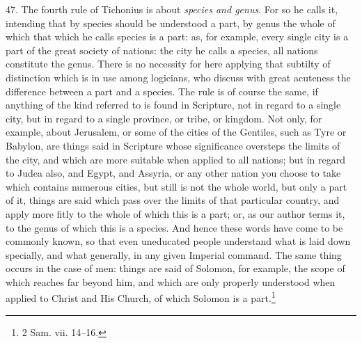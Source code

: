 47. The fourth rule of Tichonius is about \emph{species and genus}. For so he calls it, intending that by species should be understood a part, by genus the whole of which that which he calls species is a part: as, for example, every single city is a part of the great society of nations: the city he calls a species, all  nations constitute the genus. There is no necessity for here applying that subtilty of distinction which is in use among logicians, who discuss with great acuteness the difference between a part and a species. The rule is of course the same, if anything of the kind referred to is found in Scripture, not in regard to a single city, but in regard to a single province, or tribe, or kingdom. Not only, for example, about Jerusalem, or some of the cities of the Gentiles, such as Tyre or Babylon, are things said in Scripture whose significance oversteps the limits of the city, and which are more suitable when applied to all nations; but in regard to Judea also, and Egypt, and Assyria, or any other nation you choose to take which contains numerous cities, but still is not the whole world, but only a part of it, things are said which pass over the limits of that particular country, and apply more fitly to the whole of which this is a part; or, as our author terms it, to the genus of which this is a species. And hence these words have come to be commonly known, so that even uneducated people understand what is laid down specially, and what generally, in any given Imperial command. The same thing occurs in the case of men: things are said of Solomon, for example, the scope of which reaches far beyond him, and which are only properly understood when applied to Christ and His Church, of which Solomon is a part.\footnote{2 Sam. vii. 14–16.}

